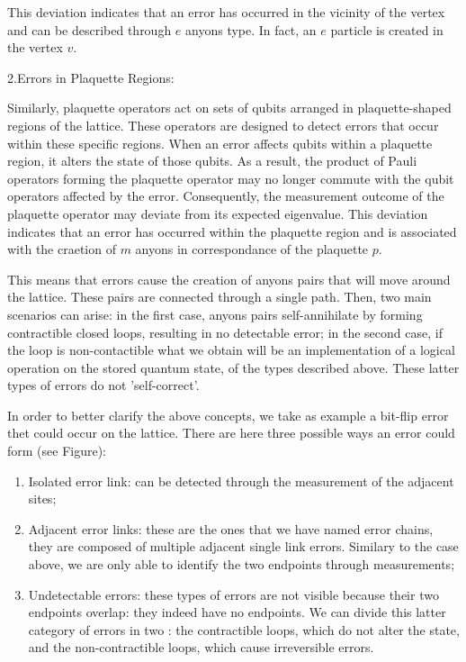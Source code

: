 \documentclass{Configuration_Files/PoliMi3i_thesis}
\begin{document}
This deviation indicates that an error has occurred in the vicinity of the vertex and can be described through $e$ anyons type. In fact, an $e$ particle is created in the vertex $v$. \newline


2.Errors in Plaquette Regions:

Similarly, plaquette operators act on sets of qubits arranged in plaquette-shaped regions of the lattice. These operators are designed to detect errors that occur within these specific regions.
When an error affects qubits within a plaquette region, it alters the state of those qubits. As a result, the product of Pauli operators forming the plaquette operator may no longer commute with the qubit operators affected by the error.
Consequently, the measurement outcome of the plaquette operator may deviate from its expected eigenvalue. 
This deviation indicates that an error has occurred within the plaquette region and is associated with the craetion of $m$ anyons in correspondance of the plaquette $p$. \newline

This means that errors cause the creation of anyons pairs that will move around the lattice. These pairs are connected through a single path. Then, two main scenarios can arise: in the first case, anyons pairs self-annihilate by forming contractible closed loops, resulting in no detectable error; in the second case, if the loop is non-contactible what we obtain will be an implementation of a logical operation on the stored quantum state, of the types described above. These latter types of errors do not 'self-correct'. \newline

In order to better clarify the above concepts, we take as example a bit-flip error thet could occur on the lattice. There are here three possible ways an error could form (see Figure): \newline

\begin{enumerate}
	\item Isolated error link: can be detected through the measurement of the adjacent sites;
	
	
	\item Adjacent error links: these are the ones that we have named error chains, they are composed of multiple adjacent single link errors. Similary to the case above, we are only able to identify the two endpoints through measurements;
	
	
	\item Undetectable errors: these types of errors are not visible because their two endpoints overlap: they indeed have no endpoints. We can divide this latter category of errors in two : the contractible loops, which do not alter the state, and the non-contractible loops, which cause irreversible errors.
	
	
\end{enumerate}
\end{document}
